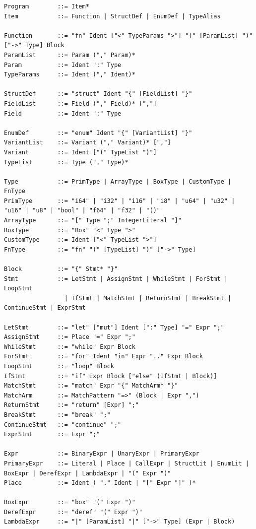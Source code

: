 \begin{lstlisting}[caption={Complete EBNF Grammar of the NumLang Programming Language.}]
Program        ::= Item*
Item           ::= Function | StructDef | EnumDef | TypeAlias

Function       ::= "fn" Ident ["<" TypeParams ">"] "(" [ParamList] ")" ["->" Type] Block
ParamList      ::= Param ("," Param)*
Param          ::= Ident ":" Type
TypeParams     ::= Ident ("," Ident)*

StructDef      ::= "struct" Ident "{" [FieldList] "}"
FieldList      ::= Field ("," Field)* [","]
Field          ::= Ident ":" Type

EnumDef        ::= "enum" Ident "{" [VariantList] "}"
VariantList    ::= Variant ("," Variant)* [","]
Variant        ::= Ident ["(" TypeList ")"]
TypeList       ::= Type ("," Type)*

Type           ::= PrimType | ArrayType | BoxType | CustomType | FnType
PrimType       ::= "i64" | "i32" | "i16" | "i8" | "u64" | "u32" | "u16" | "u8" | "bool" | "f64" | "f32" | "()"
ArrayType      ::= "[" Type ";" IntegerLiteral "]"
BoxType        ::= "Box" "<" Type ">"
CustomType     ::= Ident ["<" TypeList ">"]
FnType         ::= "fn" "(" [TypeList] ")" ["->" Type]

Block          ::= "{" Stmt* "}"
Stmt           ::= LetStmt | AssignStmt | WhileStmt | ForStmt | LoopStmt
                 | IfStmt | MatchStmt | ReturnStmt | BreakStmt | ContinueStmt | ExprStmt

LetStmt        ::= "let" ["mut"] Ident [":" Type] "=" Expr ";"
AssignStmt     ::= Place "=" Expr ";"
WhileStmt      ::= "while" Expr Block
ForStmt        ::= "for" Ident "in" Expr ".." Expr Block
LoopStmt       ::= "loop" Block
IfStmt         ::= "if" Expr Block ["else" (IfStmt | Block)]
MatchStmt      ::= "match" Expr "{" MatchArm* "}"
MatchArm       ::= MatchPattern "=>" (Block | Expr ",")
ReturnStmt     ::= "return" [Expr] ";"
BreakStmt      ::= "break" ";"
ContinueStmt   ::= "continue" ";"
ExprStmt       ::= Expr ";"

Expr           ::= BinaryExpr | UnaryExpr | PrimaryExpr
PrimaryExpr    ::= Literal | Place | CallExpr | StructLit | EnumLit | BoxExpr | DerefExpr | LambdaExpr | "(" Expr ")"
Place          ::= Ident ( "." Ident | "[" Expr "]" )*

BoxExpr        ::= "box" "(" Expr ")"
DerefExpr      ::= "deref" "(" Expr ")"
LambdaExpr     ::= "|" [ParamList] "|" ["->" Type] (Expr | Block)
\end{lstlisting}

